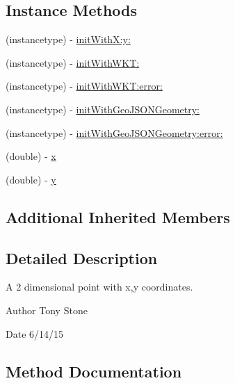 \subsection*{Instance Methods}
\begin{DoxyCompactItemize}
\item 
(instancetype) -\/ \hyperlink{interface_g_f_point_af63bcab9cd2d2fd5d8f4f9feedf55bb2}{init\+With\+X\+:y\+:}
\item 
(instancetype) -\/ \hyperlink{interface_g_f_point_ae5497af29fc8105557b2f6eb5c60ad1d}{init\+With\+W\+K\+T\+:}
\item 
(instancetype) -\/ \hyperlink{interface_g_f_point_a0793480ce53d67168442417baad4bd1d}{init\+With\+W\+K\+T\+:error\+:}
\item 
(instancetype) -\/ \hyperlink{interface_g_f_point_aed287f2d4f50a2efe3ffe6c7f58993b7}{init\+With\+Geo\+J\+S\+O\+N\+Geometry\+:}
\item 
(instancetype) -\/ \hyperlink{interface_g_f_point_ab4ec12454534ef7c43f3928fef291839}{init\+With\+Geo\+J\+S\+O\+N\+Geometry\+:error\+:}
\item 
(double) -\/ \hyperlink{interface_g_f_point_a5b9383f1c429724b6d938a64d468f63a}{x}
\item 
(double) -\/ \hyperlink{interface_g_f_point_a6e8ac1c0393e802c7fa7d623e0cc9599}{y}
\end{DoxyCompactItemize}
\subsection*{Additional Inherited Members}


\subsection{Detailed Description}
A 2 dimensional point with x,y coordinates. 

\begin{DoxyAuthor}{Author}
Tony Stone 
\end{DoxyAuthor}
\begin{DoxyDate}{Date}
6/14/15 
\end{DoxyDate}


\subsection{Method Documentation}
\hypertarget{interface_g_f_point_af63bcab9cd2d2fd5d8f4f9feedf55bb2}{}

